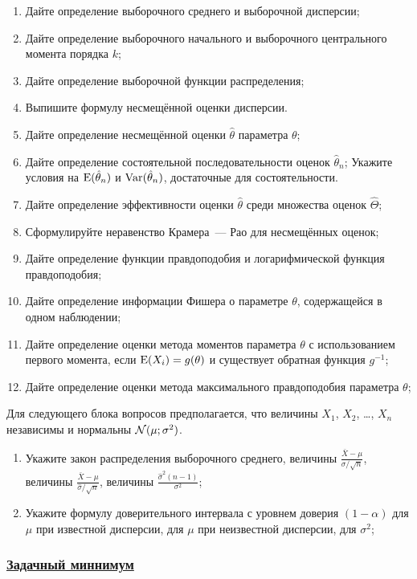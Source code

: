 \begin{enumerate}[resume]
	\item Дайте определение выборочного среднего и выборочной дисперсии;
	\item Дайте определение выборочного начального и выборочного центрального момента порядка $k$;
	\item Дайте определение выборочной функции распределения;
	\item Выпишите формулу несмещённой оценки дисперсии. 
	\item Дайте определение несмещённой оценки $\hat \theta$ параметра $\theta$;
	\item Дайте определение состоятельной последовательности оценок $\hat \theta_n$; 
	Укажите условия на $\operatorname{E}(\hat\theta_n)$ и $\operatorname{Var}(\hat\theta_n)$, достаточные для состоятельности.
	\item Дайте определение эффективности оценки $\hat \theta$ среди множества оценок $\hat \Theta$;  
	\item Сформулируйте неравенство Крамера~— Рао для несмещённых оценок;
	\item Дайте определение функции правдоподобия и логарифмической функция правдоподобия;
	\item Дайте определение информации Фишера о параметре $\theta$, содержащейся в одном наблюдении;
	\item Дайте определение оценки метода моментов параметра $\theta$ с использованием первого момента,
	если $\operatorname{E}(X_i)=g(\theta)$ и существует обратная функция $g^{-1}$;
  \item Дайте определение оценки метода максимального правдоподобия параметра $\theta$;
\end{enumerate}


Для следующего блока вопросов предполагается, что величины $X_1$, $X_2$, \ldots, $X_n$ независимы и нормальны $\mathcal{N}(\mu;\sigma^2)$.

\begin{enumerate}[resume]
  \item Укажите закон распределения выборочного среднего,
	величины $\frac{\bar X - \mu}{\sigma/\sqrt{n}}$,
	величины $\frac{\bar X - \mu}{\hat\sigma/\sqrt{n}}$,
	величины $\frac{\hat\sigma^2(n-1)}{\sigma^2}$;
  \item Укажите формулу доверительного интервала с уровнем доверия
	$(1-\alpha)$ для $\mu$ при известной дисперсии,
	для $\mu$ при неизвестной дисперсии, для $\sigma^2$;
\end{enumerate}


\newpage
\subsubsection*{\hyperref[sec:sol_minimum_kr_03]{Задачный миннимум}}
\label{sec:minimum_kr_03}

